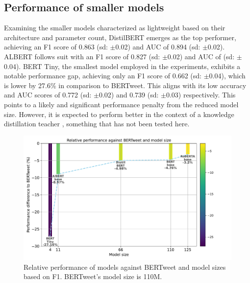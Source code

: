\subsection{Performance of smaller models}
Examining the smaller models characterized as lightweight based on their architecture and parameter count, DistilBERT emerges as the top performer, achieving an F1 score of 0.863 (sd: $\pm$0.02) and AUC of 0.894 (sd: $\pm$0.02). ALBERT follows suit with an F1 score of 0.827 (sd: $\pm$0.02) and AUC of (sd: $\pm$0.04). BERT Tiny, the smallest model employed in the experiments, exhibits a notable performance gap, achieving only an F1 score of 0.662 (sd: $\pm$0.04), which is lower by 27.6\% in comparison to BERTweet. This aligns with its low accuracy and AUC scores of 0.772 (sd: $\pm$0.02) and 0.739 (sd: $\pm$0.03) respectively. This points to a likely and significant performance penalty from the reduced model size. However, it is expected to perform better in the context of a knowledge distillation teacher \cite{turcWellReadStudentsLearn2019}, something that has not been tested here.\\

\begin{figure}[htb]
    \centering
    \captionsetup{font=small}
    \includegraphics[width=12cm]{figures/model_size_vs_perf.pdf}
    \vspace*{-3mm}
    \caption{Relative performance of models against BERTweet and model sizes based on F1. BERTweet's model size is 110M.}
    \label{fig: model_size_vs_perf}
\end{figure}


